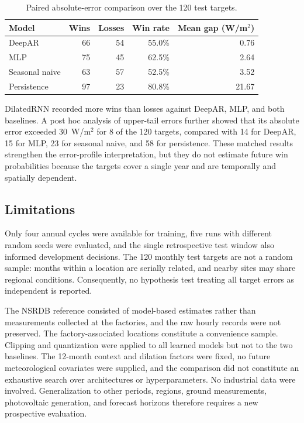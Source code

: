 \documentclass[runningheads]{llncs}
\begin{document}
\begin{table}[H]
\caption{Paired absolute-error comparison over the 120 test targets.}
\label{tab:paired}
\centering
\scriptsize
\setlength{\tabcolsep}{5.0pt}
\begin{tabular}{@{}lrrrr@{}}
\toprule
\textbf{Model} & \textbf{Wins} & \textbf{Losses} & \textbf{Win rate} & \textbf{Mean gap (W/m$^2$)} \\
\midrule
DeepAR         & 66 & 54 & 55.0\% & 0.76 \\
MLP            & 75 & 45 & 62.5\% & 2.64 \\
Seasonal naive & 63 & 57 & 52.5\% & 3.52 \\
Persistence    & 97 & 23 & 80.8\% & 21.67 \\
\bottomrule
\end{tabular}
\end{table}

DilatedRNN recorded more wins than losses against DeepAR, MLP, and both baselines. A post hoc analysis of upper-tail errors further showed that its absolute error exceeded 30~W/m$^2$ for 8 of the 120 targets, compared with 14 for DeepAR, 15 for MLP, 23 for seasonal naive, and 58 for persistence. These matched results strengthen the error-profile interpretation, but they do not estimate future win probabilities because the targets cover a single year and are temporally and spatially dependent.

\subsection{Limitations}

Only four annual cycles were available for training, five runs with different random seeds were evaluated, and the single retrospective test window also informed development decisions. The 120 monthly test targets are not a random sample: months within a location are serially related, and nearby sites may share regional conditions. Consequently, no hypothesis test treating all target errors as independent is reported.

The NSRDB reference consisted of model-based estimates rather than measurements collected at the factories, and the raw hourly records were not preserved. The factory-associated locations constitute a convenience sample. Clipping and quantization were applied to all learned models but not to the two baselines. The 12-month context and dilation factors were fixed, no future meteorological covariates were supplied, and the comparison did not constitute an exhaustive search over architectures or hyperparameters. No industrial data were involved. Generalization to other periods, regions, ground measurements, photovoltaic generation, and forecast horizons therefore requires a new prospective evaluation.
\end{document}
